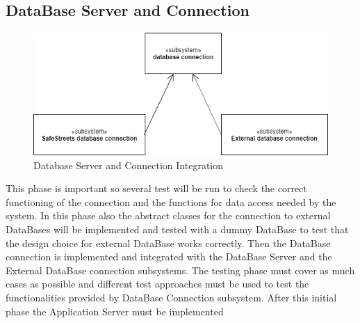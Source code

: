 \subsection{DataBase Server and Connection}
\begin{figure}[H]
\centering
\includegraphics[width=\textwidth]{Images/TestDBdiagram.png}
\caption{\label{fig:ComWI}Database Server and Connection Integration}
\end{figure}
This phase is important so several test will be run to check the correct functioning of the connection
and the functions for data access needed by the system. In this phase also the abstract classes
for the connection to external DataBases will be implemented and tested with a dummy DataBase to test
that the design choice for external DataBase works correctly. Then the DataBase connection is implemented and integrated with the DataBase Server and the External DataBase connection subsystems. The testing phase must cover as much cases as possible and different test approaches must be used to test
the functionalities provided by DataBase Connection subsystem. After this initial phase the Application
Server must be implemented

